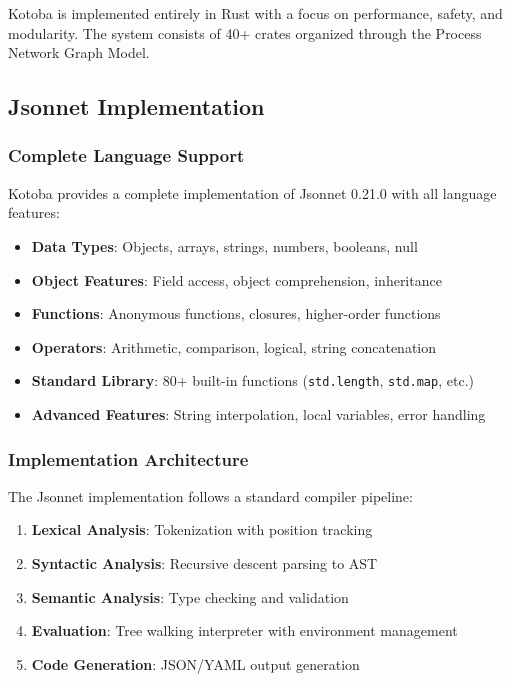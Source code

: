 \documentclass[11pt,a4paper]{article}
\begin{document}
Kotoba is implemented entirely in Rust with a focus on performance, safety, and modularity. The system consists of 40+ crates organized through the Process Network Graph Model.

\subsection{Jsonnet Implementation}
\label{subsec:jsonnet_impl}

\subsubsection{Complete Language Support}
\label{subsubsec:jsonnet_features}

Kotoba provides a complete implementation of Jsonnet 0.21.0 with all language features:

\begin{itemize}
\item \textbf{Data Types}: Objects, arrays, strings, numbers, booleans, null
\item \textbf{Object Features}: Field access, object comprehension, inheritance
\item \textbf{Functions}: Anonymous functions, closures, higher-order functions
\item \textbf{Operators}: Arithmetic, comparison, logical, string concatenation
\item \textbf{Standard Library}: 80+ built-in functions (\texttt{std.length}, \texttt{std.map}, etc.)
\item \textbf{Advanced Features}: String interpolation, local variables, error handling
\end{itemize}

\subsubsection{Implementation Architecture}
\label{subsubsec:jsonnet_architecture}

The Jsonnet implementation follows a standard compiler pipeline:

\begin{enumerate}
\item \textbf{Lexical Analysis}: Tokenization with position tracking
\item \textbf{Syntactic Analysis}: Recursive descent parsing to AST
\item \textbf{Semantic Analysis}: Type checking and validation
\item \textbf{Evaluation}: Tree walking interpreter with environment management
\item \textbf{Code Generation}: JSON/YAML output generation
\end{enumerate}
\end{document}
